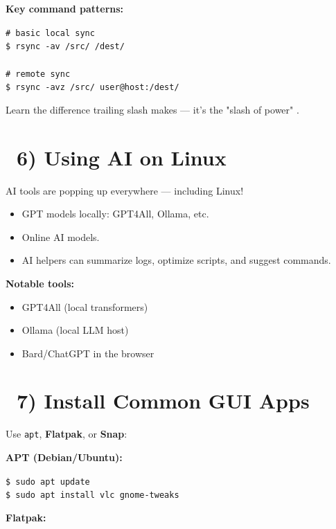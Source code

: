 \documentclass[12pt]{article}
\newcommand{\toolicon}{\faTools}
\newcommand{\aiicon}{\faRobot}
\begin{document}
\textbf{Key command patterns:}

\begin{highlightbox}
\texttt{\# basic local sync}\\
\texttt{\$ rsync -av /src/ /dest/}\\
\\
\texttt{\# remote sync}\\
\texttt{\$ rsync -avz /src/ user@host:/dest/}
\end{highlightbox}

Learn the difference trailing slash makes — it's the "slash of power" \faCrosshairs.

\section*{\aiicon\ 6) Using AI on Linux}

AI tools are popping up everywhere — including Linux!

\begin{itemize}
    \item GPT models locally: GPT4All, Ollama, etc.
    \item Online AI models.
    \item AI helpers can summarize logs, optimize scripts, and suggest commands.
\end{itemize}

\textbf{Notable tools:}

\begin{itemize}
    \item GPT4All (local transformers)
    \item Ollama (local LLM host)
    \item Bard/ChatGPT in the browser
\end{itemize}

\section*{\toolicon\ 7) Install Common GUI Apps}

Use \texttt{apt}, \textbf{Flatpak}, or \textbf{Snap}:

\textbf{APT (Debian/Ubuntu):}

\begin{highlightbox}
\texttt{\$ sudo apt update}\\
\texttt{\$ sudo apt install vlc gnome-tweaks}
\end{highlightbox}

\textbf{Flatpak:}
\end{document}
